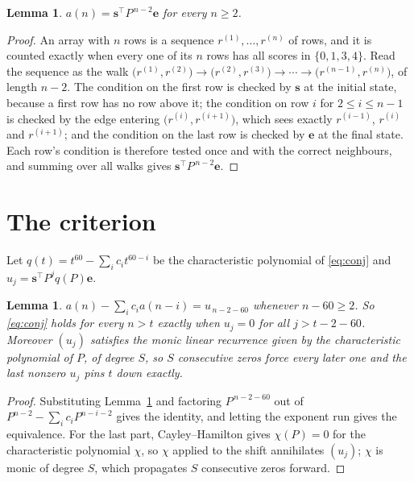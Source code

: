 \documentclass[11pt,a4paper]{article}
\theoremstyle{plain}
\newtheorem{lemma}[theorem]{Lemma}
\theoremstyle{definition}
\begin{document}
\begin{lemma}\label{lem:walk}
$a(n)=\mathbf{s}^{\!\top}P^{\,n-2}\mathbf{e}$ for every $n\ge2$.
\end{lemma}

\begin{proof}
An array with $n$ rows is a sequence $r^{(1)},\dots,r^{(n)}$ of rows, and it is counted
exactly when every one of its $n$ rows has all scores in $\{0,1,3,4\}$. Read the sequence as the
walk $\bigl(r^{(1)},r^{(2)}\bigr)\to\bigl(r^{(2)},r^{(3)}\bigr)\to\cdots\to
\bigl(r^{(n-1)},r^{(n)}\bigr)$, of length $n-2$. The condition on the first row is
checked by $\mathbf{s}$ at the initial state, because a first row has no row above it; the
condition on row $i$ for $2\le i\le n-1$ is checked by the edge entering
$\bigl(r^{(i)},r^{(i+1)}\bigr)$, which sees exactly $r^{(i-1)}$, $r^{(i)}$ and
$r^{(i+1)}$; and the condition on the last row is checked by $\mathbf{e}$ at the final
state. Each row's condition is therefore tested once and with the correct neighbours, and
summing over all walks gives $\mathbf{s}^{\!\top}P^{\,n-2}\mathbf{e}$.
\end{proof}

\section{The criterion}

Let $q(t)=t^{60}-\sum_i c_i t^{60-i}$ be the characteristic polynomial of
\eqref{eq:conj} and $u_j=\mathbf{s}^{\!\top}P^{j}q(P)\mathbf{e}$.

\begin{lemma}\label{lem:crit}
$a(n)-\sum_i c_i a(n-i)=u_{\,n-2-60}$ whenever $n-60\ge2$. So \eqref{eq:conj}
holds for every $n>t$ exactly when $u_j=0$ for all $j>t-2-60$. Moreover $(u_j)$
satisfies the monic linear recurrence given by the characteristic polynomial of $P$, of
degree $S$, so $S$ consecutive zeros force every later one and the last nonzero $u_j$ pins
$t$ down exactly.
\end{lemma}

\begin{proof}
Substituting Lemma~\ref{lem:walk} and factoring $P^{\,n-2-60}$ out of
$P^{n-2}-\sum_i c_i P^{n-i-2}$ gives the identity, and letting the exponent run gives the
equivalence. For the last part, Cayley--Hamilton gives $\chi(P)=0$ for the characteristic
polynomial $\chi$, so $\chi$ applied to the shift annihilates $(u_j)$; $\chi$ is monic of
degree $S$, which propagates $S$ consecutive zeros forward.
\end{proof}
\end{document}
